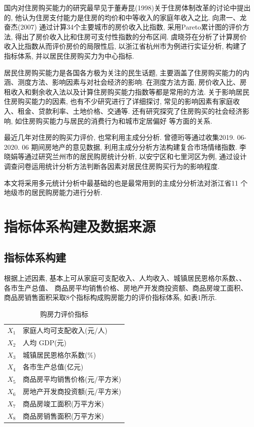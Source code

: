 \documentclass[a4paper, 12pt, twoside]{ctexart}
\renewcommand\arraystretch{1}
\begin{document}
  国内对住房购买能力的研究最早见于董寿昆(1998)关于住房体制改革的讨论中提出的, 他认为住房支付能力是住房的均价和中等收入的家庭年收入之比. 向肃一、龙奋杰(2007) 通过计算34个主要城市的房价收入比指数, 采用Pareto累计图的评价方法, 得出了房价收入比和住房可支付性指数的分布区间. 虞晓芬在分析了计算房价收入比指数从而评价房价的局限性后, 以浙江省杭州市为例进行实证分析, 构建了指标体系, 并以居民住房购买力为中心指标.

  居民住房购买能力是各国各方极为关注的民生话题, 主要涵盖了住房购买能力的内涵、测度方法、影响因素与对社会经济的影响. 在测度方法方面, 房价收入比、房租收入和剩余收入法以及计算住房购买能力指数等都是常用的方法. 关于影响居民住房购买能力的因素, 也有不少研究进行了详细探讨, 常见的影响因素有家庭收入、租金、贷款利率、土地价格、交通等. 还有研究探究了住房购买的社会经济影响, 如住房购买能力与居民的消费行为和城市定居偏好 等方面的关系.

   最近几年对住房的购买力评价, 也常利用主成分分析. 曾德珩等通过收集2019. 06-2020. 06 期间房地产的意见数据, 利用主成分分析方法构建复合市场情绪指数. 李晓娟等通过研究兰州市的居民购房统计分析, 以安宁区和七里河区为例, 通过设计调查问卷运用统计分析方法判断各因素对居民住房购买行为的影响程度.

  本文将采用多元统计分析中最基础的也是最常用到的主成分分析法对浙江省11 个地级市的居民购房能力进行分析.



\section{指标体系构建及数据来源}
\subsection{指标体系构建}

    根据上述因素, 基本上可从家庭可支配收入、人均收入、城镇居民恩格尔系数、、各市生产总值、 商品房平均销售价格、房地产开发商投资额、商品房竣工面积、商品房销售面积采取8个指标构成购房能力的评价指标体系, 如表1所示.
   \begin{table}[H]
   \renewcommand\arraystretch{1}
    \centering
    \caption{购房力评价指标}\medskip   {}
   \begin{tabular}{lp{}}
        \toprule
        \hline
        $X_1$&家庭人均可支配收入(元/人)\\
        $X_2$&人均 GDP(元)\\
        $X_3$&城镇居民恩格尔系数(\%)\\
        $X_4$&各市生产总值(亿元) \\
        $X_5$&商品房平均销售价格(元/平方米)\\
        $X_6$&房地产开发商投资额(元/平方米)\\
        $X_7$&商品房竣工面积(万平方米)\\
        $X_8$&商品房销售面积(万平方米)\\
        \hline
        \bottomrule
    \end{tabular}
\end{table}
\end{document}
